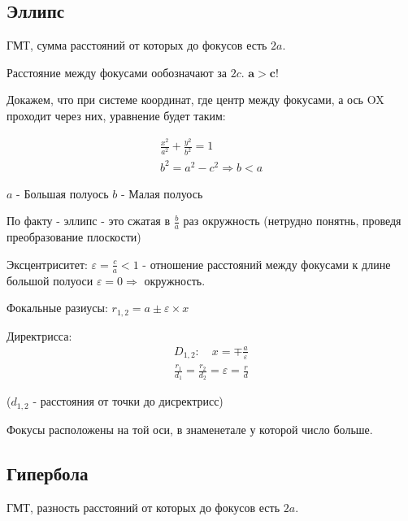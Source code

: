\documentclass[12pt, a4paper]{article}
\begin{document}
    \subsection{Эллипс}
    
    \begin{definition}
        [Эллипс]
        ГМТ, сумма расстояний от которых до фокусов есть $2a$.
    \end{definition}

    Расстояние между фокусами ообозначают за $2c$.
    $\symbf{a > c}$!

    Докажем, что при системе координат, где центр между фокусами, а ось OX проходит через них, уравнение будет таким:

    \begin{gather}
        \frac{x^2}{a^2} + \frac{y^2}{b^2} = 1 \\
        b^2 = a^2 - c^2 \Rightarrow b < a
    \end{gather}

    $a$ - Большая полуось
    $b$ - Малая полуось

    По факту - эллипс - это сжатая в $\frac ba$ раз окружность (нетрудно понятнь, проведя преобразование плоскости)

    Эксцентриситет: $\varepsilon = \frac{c}{a} < 1$ - отношение расстояний между фокусами к длине большой полуоси
    $\varepsilon = 0 \Rightarrow$ окружность.

    Фокальные разиусы:
    $r_{1, 2} = a \pm \varepsilon \times x$

    Директрисса: 
    \begin{gather}
        D_{1, 2}: \quad x = \mp \frac{a}{\varepsilon} \\
        \frac{r_1}{d_1} = \frac{r_2}{d_2} = \varepsilon = \frac{r}{d}
    \end{gather}

    ($d_{1, 2}$ - расстояния от точки до дисректрисс)

    \begin{note}
        Фокусы расположены на той оси, в знаменетале у которой число больше.
    \end{note}

    \subsection{Гипербола}
    
    \begin{definition}
        [Гипербола]
        ГМТ, разность расстояний от которых до фокусов есть $2a$.
    \end{definition}
\end{document}
